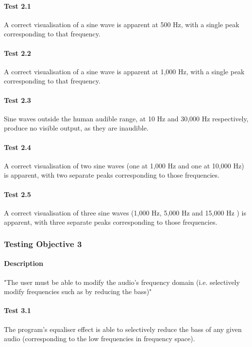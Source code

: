 \begin{multicols}{2}
\paragraph{Test 2.1} A correct visualisation of a sine wave is apparent at 500 Hz, with a single peak corresponding to that frequency.
\paragraph{Test 2.2} A correct visualisation of a sine wave is apparent at 1,000 Hz, with a single peak corresponding to that frequency.
\paragraph{Test 2.3} Sine waves outside the human audible range, at 10 Hz and 30,000 Hz respectively, produce no visible output, as they are inaudible.
\paragraph{Test 2.4} A correct visualisation of two sine waves (one at 1,000 Hz and one at 10,000 Hz) is apparent, with two separate peaks corresponding to those frequencies.
\paragraph{Test 2.5} A correct visualisation of three sine waves (1,000 Hz, 5,000 Hz and 15,000 Hz ) is apparent, with three separate peaks corresponding to those frequencies.
\end{multicols}

\pagebreak
\subsubsection{Testing Objective 3}
\paragraph{Description} "The user must be able to modify the audio's frequency domain (i.e. selectively modify frequencies such as by reducing the bass)"

\paragraph{Test 3.1}
The program's equaliser effect is able to selectively reduce the bass of any given audio (corresponding to the low frequencies in frequency space).

